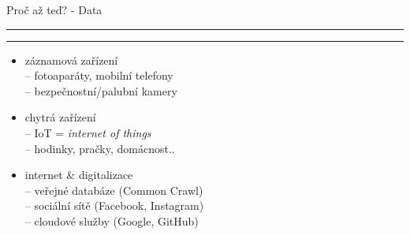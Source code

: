 \documentclass[aspectratio=43]{beamer}
\def\vs{\vspace{-2mm}}
\def\lend{\phantom{g}\vspace{1.5mm}\hrule\hrule}
\begin{document}
\begin{frame}{\vs Proč až teď? - Data \lend}
\vspace{2mm}
\begin{itemize}
    \small
    \item<1,3-> záznamová zařízení\\ \vspace{2.5mm}
        -- fotoaparáty, mobilní telefony\\ \vspace{2.5mm}
        -- bezpečnostní/palubní kamery\\ \vspace{4mm}
    \item<1,3-> chytrá zařízení\\ \vspace{2.5mm}
        -- IoT = \textit{internet of things}\\ \vspace{2.5mm}
        -- hodinky, pračky, domácnost..\\ \vspace{4mm}
    \item<3-> internet \& digitalizace\\ \vspace{2.5mm}
        -- veřejné databáze (Common Crawl)\\ \vspace{2.5mm}
        -- sociální sítě (Facebook, Instagram)\\ \vspace{2.5mm}
        -- cloudové služby (Google, GitHub)\\ \vspace{2.5mm}
\end{itemize}
\end{frame}
\end{document}

